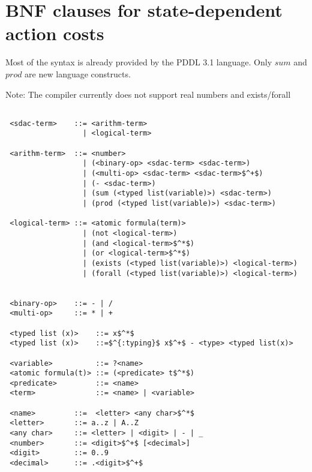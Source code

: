 \documentclass[letterpaper]{article}
\begin{document}
\section*{BNF clauses for state-dependent action costs}
Most of the syntax is already provided by the PDDL 3.1 language. Only $sum$ and
$prod$ are new language constructs.

Note: The compiler currently does not support real numbers and exists/forall

\begin{lstlisting}

 <sdac-term>    ::= <arithm-term>
                  | <logical-term>

 <arithm-term>  ::= <number>
                  | (<binary-op> <sdac-term> <sdac-term>)
                  | (<multi-op> <sdac-term> <sdac-term>$^+$)
                  | (- <sdac-term>)
                  | (sum (<typed list(variable)>) <sdac-term>)
                  | (prod (<typed list(variable)>) <sdac-term>)

 <logical-term> ::= <atomic formula(term)>
                  | (not <logical-term>)
                  | (and <logical-term>$^*$)
                  | (or <logical-term>$^*$)
                  | (exists (<typed list(variable)>) <logical-term>)
                  | (forall (<typed list(variable)>) <logical-term>)


 <binary-op>    ::= - | /
 <multi-op>     ::= * | +

 <typed list (x)>    ::= x$^*$
 <typed list (x)>    ::=$^{:typing}$ x$^+$ - <type> <typed list(x)>

 <variable>          ::= ?<name>
 <atomic formula(t)> ::= (<predicate> t$^*$)
 <predicate>         ::= <name>
 <term>              ::= <name> | <variable>

 <name>         ::=  <letter> <any char>$^*$
 <letter>       ::= a..z | A..Z
 <any char>     ::= <letter> | <digit> | - | _
 <number>       ::= <digit>$^+$ [<decimal>]
 <digit>        ::= 0..9
 <decimal>      ::= .<digit>$^+$


\end{lstlisting}
\end{document}
